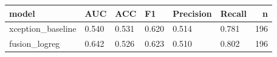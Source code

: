 \begin{tabular}{llllllr}
\toprule
model & AUC & ACC & F1 & Precision & Recall & n \\
\midrule
xception\_baseline & 0.540 & 0.531 & 0.620 & 0.514 & 0.781 & 196 \\
fusion\_logreg & 0.642 & 0.526 & 0.623 & 0.510 & 0.802 & 196 \\
\bottomrule
\end{tabular}
